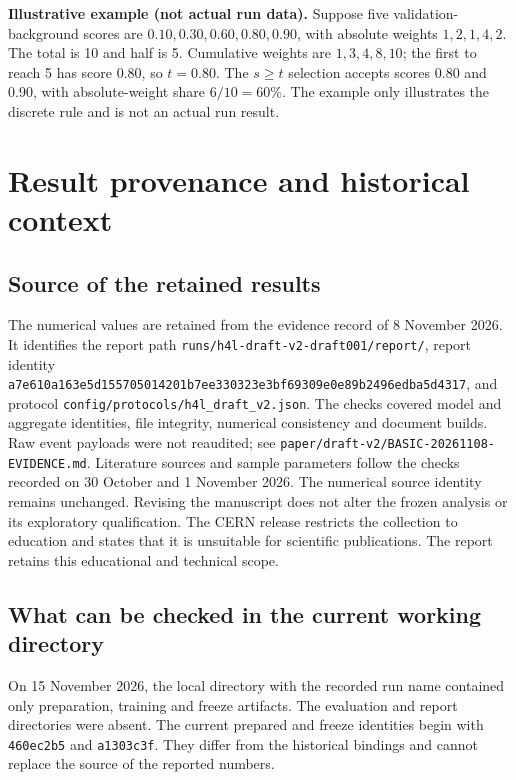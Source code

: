 \documentclass[11pt,a4paper]{article}
\begin{document}
\textbf{Illustrative example (not actual run data).}
Suppose five validation-background scores are $0.10,0.30,0.60,0.80,0.90$, with absolute weights $1,2,1,4,2$.
The total is 10 and half is 5. Cumulative weights are $1,3,4,8,10$; the first to reach 5 has score 0.80, so $t=0.80$.
The $s\geq t$ selection accepts scores 0.80 and 0.90, with absolute-weight share $6/10=60\%$.
The example only illustrates the discrete rule and is not an actual run result.
\FloatBarrier

\section{Result provenance and historical context}\label{app:provenance}

\subsection{Source of the retained results}
The numerical values are retained from the evidence record of 8 November 2026. It identifies the report path \nolinkurl{runs/h4l-draft-v2-draft001/report/}, report identity
\nolinkurl{a7e610a163e5d155705014201b7ee330323e3bf69309e0e89b2496edba5d4317}, and protocol \nolinkurl{config/protocols/h4l_draft_v2.json}.
The checks covered model and aggregate identities, file integrity, numerical consistency and document builds. Raw event payloads were not reaudited; see \nolinkurl{paper/draft-v2/BASIC-20261108-EVIDENCE.md}.
Literature sources and sample parameters follow the checks recorded on 30 October and 1 November 2026.
The numerical source identity remains unchanged. Revising the manuscript does not alter the frozen analysis or its exploratory qualification.
The CERN release restricts the collection to education and states that it is unsuitable for scientific publications. The report retains this educational and technical scope.

\subsection{What can be checked in the current working directory}\label{app:availability}
On 15 November 2026, the local directory with the recorded run name contained only preparation, training and freeze artifacts. The evaluation and report directories were absent.
The current prepared and freeze identities begin with \texttt{460ec2b5} and \texttt{a1303c3f}. They differ from the historical bindings and cannot replace the source of the reported numbers.
\end{document}
